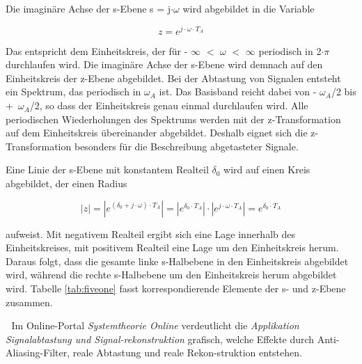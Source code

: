 \noindent Die imagin\"{a}re Achse der s-Ebene s = j$\cdot\omega$ wird abgebildet in die Variable 

\begin{equation}\label{eq:fivethirtyone}
z=e^{j\cdot \omega \cdot T_{A} } 
\end{equation}

\noindent Das entspricht dem Einheitskreis, der f\"{u}r - $\infty$ $\mathrm{<}$ $\omega$ $\mathrm{<}$ $\infty$ periodisch in 2$\cdot\pi$ durchlaufen wird. Die imagin\"{a}re Achse der s-Ebene wird demnach auf den Einheitskreis der z-Ebene abgebildet. Bei der Abtastung von Signalen entsteht ein Spektrum, das periodisch in $\omega_{A}$ ist. Das Basisband reicht dabei von - $\omega_{A}$/2 bis +~$\omega_{A}$/2, so dass der Einheitskreis genau einmal durchlaufen wird. Alle periodischen Wiederholungen des Spektrums werden mit der z-Transformation auf dem Einheitskreis \"{u}bereinander abgebildet. Deshalb eignet sich die z-Transformation besonders f\"{u}r die Beschreibung abgetasteter Signale.

\noindent Eine Linie der s-Ebene mit konstantem Realteil $\delta_{0}$ wird auf einen Kreis abgebildet, der einen Radius 

\begin{equation}\label{eq:fivethirtytwo}
\left|z\right|=\left|e^{\left(\delta _{0} +j\cdot \omega \right)\cdot T_{A} } \right|=\left|e^{\delta _{0} \cdot T_{A} } \right|\cdot \left|e^{j\cdot \omega \cdot T_{A} } \right|=e^{\delta _{0} \cdot T_{A} } 
\end{equation}

\noindent aufweist. Mit negativem Realteil ergibt sich eine Lage innerhalb des Einheitskreises, mit positivem Realteil eine Lage um den Einheitskreis herum. Daraus folgt, dass die gesamte linke s-Halbebene in den Einheitskreis abgebildet wird, w\"{a}hrend die rechte s-Halbebene um den Einheitskreis herum abgebildet wird. Tabelle \ref{tab:fiveone} fasst korrespondierende Elemente der s- und z-Ebene zusammen.

\textcolor{white}{.}\newline
\noindent Im Online-Portal \textit{Systemtheorie Online} verdeutlicht die \textit{Applikation Signalabtastung und Signal-rekonstruktion} grafisch, welche Effekte durch Anti-Aliasing-Filter, reale Abtastung und reale Rekon-struktion entstehen.\newline   

